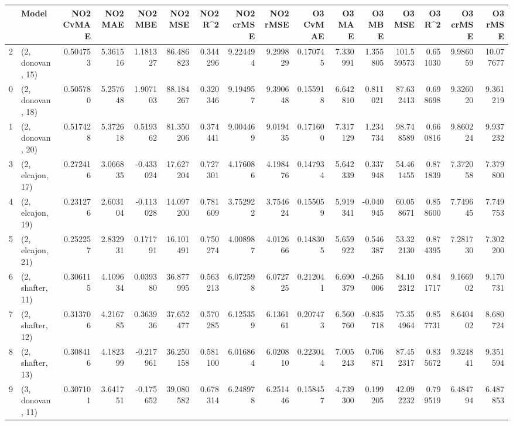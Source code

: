 \begin{tabular}{llrrrrrrrrrrrrrr}
\toprule
{} &             Model &  NO2 CvMAE &   NO2 MAE &   NO2 MBE &    NO2 MSE &   NO2 R\textasciicircum2 &  NO2 crMSE &  NO2 rMSE &  O3 CvMAE &    O3 MAE &    O3 MBE &      O3 MSE &    O3 R\textasciicircum2 &   O3 crMSE &    O3 rMSE \\
\midrule
2  &  (2, donovan, 15) &   0.504753 &  5.361516 &  1.181327 &  86.486823 &  0.344296 &   9.224494 &  9.299829 &  0.170745 &  7.330991 &  1.355805 &  101.559573 &  0.651030 &   9.986059 &  10.077677 \\
0  &  (2, donovan, 18) &   0.505780 &  5.257648 &  1.907103 &  88.184267 &  0.320346 &   9.194957 &  9.390648 &  0.155918 &  6.642810 &  0.811021 &   87.632413 &  0.698698 &   9.326020 &   9.361219 \\
1  &  (2, donovan, 20) &   0.517428 &  5.372618 &  0.519362 &  81.350206 &  0.374441 &   9.004469 &  9.019435 &  0.171600 &  7.317129 &  1.234734 &   98.748589 &  0.660816 &   9.860224 &   9.937232 \\
3  &  (2, elcajon, 17) &   0.272416 &  3.066835 & -0.433024 &  17.627204 &  0.727301 &   4.176086 &  4.198476 &  0.147934 &  5.642339 &  0.337948 &   54.461455 &  0.871839 &   7.372058 &   7.379800 \\
4  &  (2, elcajon, 19) &   0.231276 &  2.603104 & -0.113028 &  14.097200 &  0.781609 &   3.752922 &  3.754624 &  0.155059 &  5.919341 & -0.040945 &   60.058671 &  0.858600 &   7.749645 &   7.749753 \\
5  &  (2, elcajon, 21) &   0.252257 &  2.832931 &  0.171791 &  16.101491 &  0.750274 &   4.008987 &  4.012666 &  0.148305 &  5.659922 &  0.546387 &   53.322130 &  0.874395 &   7.281730 &   7.302200 \\
6  &  (2, shafter, 11) &   0.306115 &  4.109634 &  0.039380 &  36.877995 &  0.563213 &   6.072598 &  6.072725 &  0.212041 &  6.690379 & -0.265006 &   84.102312 &  0.841717 &   9.166902 &   9.170731 \\
7  &  (2, shafter, 12) &   0.313706 &  4.216785 &  0.363936 &  37.652477 &  0.570285 &   6.125359 &  6.136161 &  0.207473 &  6.560760 & -0.835718 &   75.354964 &  0.857731 &   8.640402 &   8.680724 \\
8  &  (2, shafter, 13) &   0.308416 &  4.182399 & -0.217961 &  36.250158 &  0.581100 &   6.016864 &  6.020810 &  0.223044 &  7.005243 &  0.706871 &   87.452317 &  0.835672 &   9.324841 &   9.351594 \\
9  &  (3, donovan, 11) &   0.307101 &  3.641751 & -0.175652 &  39.080582 &  0.678314 &   6.248978 &  6.251446 &  0.158457 &  4.739300 &  0.199205 &   42.092232 &  0.799519 &   6.484794 &   6.487853 \\

\end{tabular}
